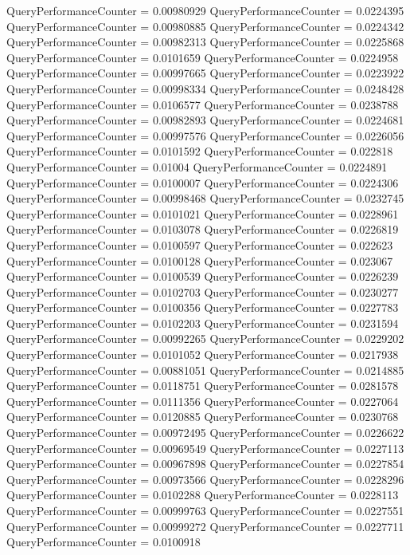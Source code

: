 \documentclass[9pt]{article}
\theoremstyle{plain}
\theoremstyle{definition}
\theoremstyle{remark}
\numberwithin{equation}{section}
\begin{document}
QueryPerformanceCounter  =  0.00980929
QueryPerformanceCounter  =  0.0224395
QueryPerformanceCounter  =  0.00980885
QueryPerformanceCounter  =  0.0224342
QueryPerformanceCounter  =  0.00982313
QueryPerformanceCounter  =  0.0225868
QueryPerformanceCounter  =  0.0101659
QueryPerformanceCounter  =  0.0224958
QueryPerformanceCounter  =  0.00997665
QueryPerformanceCounter  =  0.0223922
QueryPerformanceCounter  =  0.00998334
QueryPerformanceCounter  =  0.0248428
QueryPerformanceCounter  =  0.0106577
QueryPerformanceCounter  =  0.0238788
QueryPerformanceCounter  =  0.00982893
QueryPerformanceCounter  =  0.0224681
QueryPerformanceCounter  =  0.00997576
QueryPerformanceCounter  =  0.0226056
QueryPerformanceCounter  =  0.0101592
QueryPerformanceCounter  =  0.022818
QueryPerformanceCounter  =  0.01004
QueryPerformanceCounter  =  0.0224891
QueryPerformanceCounter  =  0.0100007
QueryPerformanceCounter  =  0.0224306
QueryPerformanceCounter  =  0.00998468
QueryPerformanceCounter  =  0.0232745
QueryPerformanceCounter  =  0.0101021
QueryPerformanceCounter  =  0.0228961
QueryPerformanceCounter  =  0.0103078
QueryPerformanceCounter  =  0.0226819
QueryPerformanceCounter  =  0.0100597
QueryPerformanceCounter  =  0.022623
QueryPerformanceCounter  =  0.0100128
QueryPerformanceCounter  =  0.023067
QueryPerformanceCounter  =  0.0100539
QueryPerformanceCounter  =  0.0226239
QueryPerformanceCounter  =  0.0102703
QueryPerformanceCounter  =  0.0230277
QueryPerformanceCounter  =  0.0100356
QueryPerformanceCounter  =  0.0227783
QueryPerformanceCounter  =  0.0102203
QueryPerformanceCounter  =  0.0231594
QueryPerformanceCounter  =  0.00992265
QueryPerformanceCounter  =  0.0229202
QueryPerformanceCounter  =  0.0101052
QueryPerformanceCounter  =  0.0217938
QueryPerformanceCounter  =  0.00881051
QueryPerformanceCounter  =  0.0214885
QueryPerformanceCounter  =  0.0118751
QueryPerformanceCounter  =  0.0281578
QueryPerformanceCounter  =  0.0111356
QueryPerformanceCounter  =  0.0227064
QueryPerformanceCounter  =  0.0120885
QueryPerformanceCounter  =  0.0230768
QueryPerformanceCounter  =  0.00972495
QueryPerformanceCounter  =  0.0226622
QueryPerformanceCounter  =  0.00969549
QueryPerformanceCounter  =  0.0227113
QueryPerformanceCounter  =  0.00967898
QueryPerformanceCounter  =  0.0227854
QueryPerformanceCounter  =  0.00973566
QueryPerformanceCounter  =  0.0228296
QueryPerformanceCounter  =  0.0102288
QueryPerformanceCounter  =  0.0228113
QueryPerformanceCounter  =  0.00999763
QueryPerformanceCounter  =  0.0227551
QueryPerformanceCounter  =  0.00999272
QueryPerformanceCounter  =  0.0227711
QueryPerformanceCounter  =  0.0100918
\end{document}
